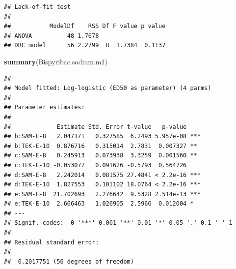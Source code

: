 \documentclass[letterpaper,]{book}
\newenvironment{Shaded}{\begin{snugshade}}{\end{snugshade}}
\newcommand{\KeywordTok}[1]{\textcolor[rgb]{0.13,0.29,0.53}{\textbf{#1}}}
\newcommand{\NormalTok}[1]{#1}
\begin{document}
\begin{verbatim}
## Lack-of-fit test
## 
##           ModelDf    RSS Df F value p value
## ANOVA          48 1.7678                   
## DRC model      56 2.2799  8  1.7384  0.1137
\end{verbatim}

\begin{Shaded}
\begin{Highlighting}[]
\KeywordTok{summary}\NormalTok{(Bispyribac.sodium.m1)}
\end{Highlighting}
\end{Shaded}

\begin{verbatim}
## 
## Model fitted: Log-logistic (ED50 as parameter) (4 parms)
## 
## Parameter estimates:
## 
##             Estimate Std. Error t-value   p-value    
## b:SAM-E-8   2.047171   0.327585  6.2493 5.957e-08 ***
## b:TEK-E-10  0.876716   0.315014  2.7831  0.007327 ** 
## c:SAM-E-8   0.245913   0.073938  3.3259  0.001560 ** 
## c:TEK-E-10 -0.053077   0.091626 -0.5793  0.564726    
## d:SAM-E-8   2.242014   0.081575 27.4841 < 2.2e-16 ***
## d:TEK-E-10  1.827553   0.101102 18.0764 < 2.2e-16 ***
## e:SAM-E-8  21.702693   2.276642  9.5328 2.514e-13 ***
## e:TEK-E-10  2.666463   1.026905  2.5966  0.012004 *  
## ---
## Signif. codes:  0 '***' 0.001 '**' 0.01 '*' 0.05 '.' 0.1 ' ' 1
## 
## Residual standard error:
## 
##  0.2017751 (56 degrees of freedom)
\end{verbatim}
\end{document}
